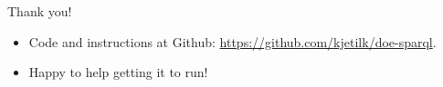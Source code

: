 \documentclass[english,handout,aspectratio=169]{ifislide}
\begin{document}
\begin{frame}{Thank you!}

  \begin{itemize}
  \item Code and instructions at Github:
    \url{https://github.com/kjetilk/doe-sparql}.
  \item Happy to help getting it to run!
  \end{itemize}

\end{frame}
\end{document}
